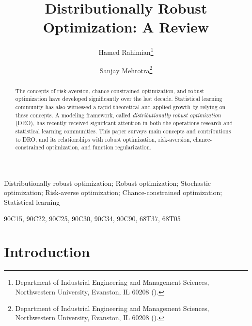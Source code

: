 \documentclass[final,onefignum,onetabnum]{class}
\title{Distributionally Robust Optimization: A Review %
}
\author{Hamed Rahimian\thanks{Department of Industrial Engineering and Management Sciences, Northwestern University, Evanston, IL 60208 
  (\email{hamed.rahimian@northwestern.edu}).}
\and Sanjay Mehrotra\thanks{Department of Industrial Engineering and Management Sciences, Northwestern University, Evanston, IL 60208 (\email{mehrotra@northwestern.edu}).}}
\begin{document}
%

\maketitle


%
\begin{abstract}
%
\noindent The concepts of risk-aversion, chance-constrained optimization, and robust optimization have developed significantly over the last decade. %
Statistical learning community has also witnessed a rapid theoretical and applied growth by relying on these concepts.  A  modeling framework, called {\it distributionally robust optimization} (DRO),  has recently received significant  attention in both the operations research and statistical learning communities. This paper surveys main concepts and contributions to DRO, and its relationships with robust optimization, risk-aversion, chance-constrained optimization, and function regularization. %
\end{abstract}


\begin{keywords}
Distributionally robust optimization; Robust optimization; Stochastic optimization; Risk-averse optimization; Chance-constrained optimization; Statistical learning
\end{keywords}

\begin{AMS}
  90C15, %
  90C22, %
  90C25, %
  90C30, %
  90C34, %
  90C90, 
  68T37,
  68T05
\end{AMS}

%
%
%



\tableofcontents




\section{Introduction}
\label{sec: rev.intro}
\end{document}
